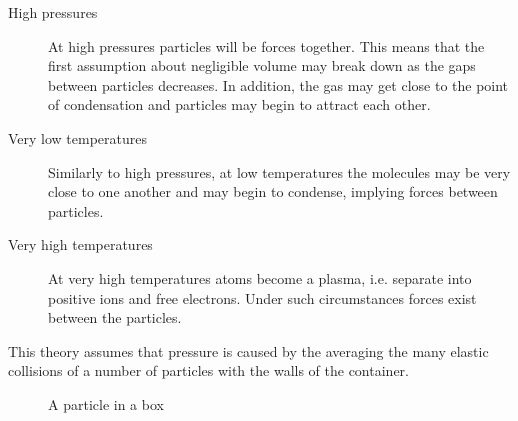 \documentclass[revision-guide.tex]{subfiles}
\begin{document}
\begin{description}
  \item[High pressures] At high pressures particles will be forces together. This means that the first assumption about negligible volume may break down as the gaps between particles decreases. In addition, the gas may get close to the point of condensation and particles may begin to attract each other.
  \item[Very low temperatures] Similarly to high pressures, at low temperatures the molecules may be very close to one another and may begin to condense, implying forces between particles.
  \item[Very high temperatures] At very high temperatures atoms become a plasma, i.e. separate into positive ions and free electrons. Under such circumstances forces exist between the particles.
\end{description}


This theory assumes that pressure is caused by the averaging the many elastic collisions of a number of particles with the walls of the container.

\begin{figure}[ht]
    \begin{center}\end{center}
    \caption{A particle in a box}
\end{figure}
\end{document}
